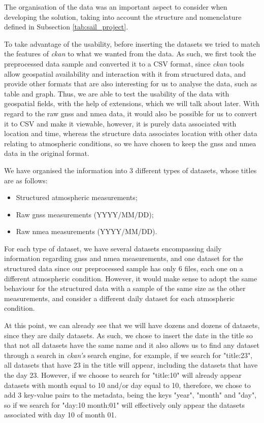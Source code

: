 The organisation of the data was an important aspect to consider when developing the solution, taking into account the structure and nomenclature defined in Subsection \ref{tab:sail_project}.

To take advantage of the usability, before inserting the datasets we tried to match the features of \textit{\gls{ckan}} to what we wanted from the data. As such, we first took the preprocessed data sample and converted it to a CSV format, since \textit{\gls{ckan}} tools allow geospatial availability and interaction with it from structured data, and provide other formats that are also interesting for us to analyse the data, such as table and graph. Thus, we are able to test the usability of the data with geospatial fields, with the help of extensions, which we will talk about later. With regard to the raw \gls{gnss} and \gls{nmea} data, it would also be possible for us to convert it to CSV and make it viewable, however, it is purely data associated with location and time, whereas the structure data associates location with other data relating to atmospheric conditions, so we have chosen to keep the \gls{gnss} and \gls{nmea} data in the original format.

We have organised the information into 3 different types of datasets, whose titles are as follows:

\begin{itemize}
    \item Structured atmospheric measurements;
    \item Raw \gls{gnss} measurements (YYYY/MM/DD);
    \item Raw \gls{nmea} measurements (YYYY/MM/DD).
\end{itemize}

For each type of dataset, we have several datasets encompassing daily information regarding \gls{gnss} and \gls{nmea} measurements, and one dataset for the structured data since our preprocessed sample has only 6 files, each one on a different atmospheric condition. However, it would make sense to adopt the same behaviour for the structured data with a sample of the same size as the other measurements, and consider a different daily dataset for each atmospheric condition.

At this point, we can already see that we will have dozens and dozens of datasets, since they are daily datasets. As such, we chose to insert the date in the title so that not all datasets have the same name and it also allows us to find any dataset through a search in \textit{\gls{ckan}'s} search engine, for example, if we search for "title:23", all datasets that have 23 in the title will appear, including the datasets that have the day 23. However, if we choose to search for "title:10" will already appear datasets with month equal to 10 and/or day equal to 10, therefore, we chose to add 3 key-value pairs to the metadata, being the keys "year", "month" and "day", so if we search for "day:10 month:01" will effectively only appear the datasets associated with day 10 of month 01.


